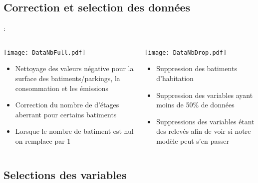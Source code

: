 \documentclass[8pt,aspectratio=169,hyperref={unicode=true}]{beamer}
\begin{document}
\subsection{Correction et selection des données}
\begin{frame}{\insertsection : \insertsubsection}
  \begin{columns}[t]
    \begin{column}{.5\textwidth}
      \texttt{[image: DataNbFull.pdf]}
      \begin{itemize}
        \item Nettoyage des valeurs négative pour la surface des batiments/parkings,
              la consommation et les émissions
        \item Correction du nombre de d'étages aberrant pour certains batiments
        \item Lorsque le nombre de batiment est nul on remplace par 1
      \end{itemize}
    \end{column}
    \begin{column}{.5\textwidth}
      \texttt{[image: DataNbDrop.pdf]}
      \begin{itemize}
        \item Suppression des batiments d'habitation
        \item Suppression des variables ayant moins de 50\% de données
        \item Suppressions des variables étant des relevés afin de voir si notre modèle
              peut s'en passer
      \end{itemize}
    \end{column}
  \end{columns}
\end{frame}

\subsection{Selections des variables}
\end{document}
